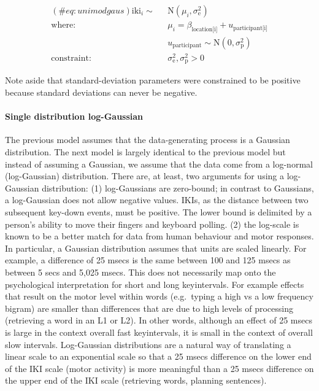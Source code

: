 \begin{appendix}
\begin{equation}
\begin{aligned}
(\#eq:unimodgaus)
\text{iki}_i \sim\text{ } & \text{N}(\mu_i, \sigma_\text{e}^2)\\
\text{where: } & \mu_i = \beta_\text{location[i]} + u_\text{participant[i]}\\
& u_\text{participant} \sim \text{N}(0, \sigma_\text{p}^2)\\
\text{constraint: } & \sigma_\text{e}^2, \sigma_\text{p}^2>0
\end{aligned}
\end{equation}

Note aside that standard-deviation parameters were constrained to be
positive because standard deviations can never be negative.

\hypertarget{single-distribution-log-gaussian}{%
\paragraph{Single distribution
log-Gaussian}\label{single-distribution-log-gaussian}}

The previous model assumes that the data-generating process is a
Gaussian distribution. The next model is largely identical to the
previous model but instead of assuming a Gaussian, we assume that the
data come from a log-normal (log-Gaussian) distribution. There are, at
least, two arguments for using a log-Gaussian distribution: (1)
log-Gaussians are zero-bound; in contrast to Gaussians, a log-Gaussian
does not allow negative values. IKIs, as the distance between two
subsequent key-down events, must be positive. The lower bound is
delimited by a person's ability to move their fingers and keyboard
polling. (2) the log-scale is known to be a better match for data from
human behaviour and motor responses. In particular, a Gaussian
distribution assumes that units are scaled linearly. For example, a
difference of 25 msecs is the same between 100 and 125 msecs as between
5 secs and 5,025 msecs. This does not necessarily map onto the
psychological interpretation for short and long keyintervals. For
example effects that result on the motor level within words (e.g.~typing
a high vs a low frequency bigram) are smaller than differences that are
due to high levels of processing (retrieving a word in an L1 or L2). In
other words, although an effect of 25 msecs is large in the context
overall fast keyintervals, it is small in the context of overall slow
intervals. Log-Gaussian distributions are a natural way of translating a
linear scale to an exponential scale so that a 25 msecs difference on
the lower end of the IKI scale (motor activity) is more meaningful than
a 25 msecs difference on the upper end of the IKI scale (retrieving
words, planning sentences).


\end{appendix}
